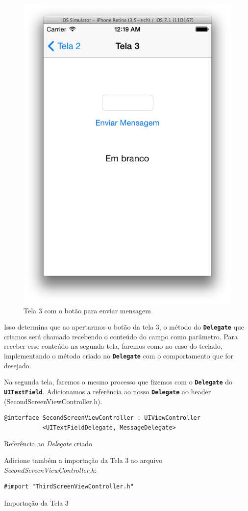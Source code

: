 \documentclass[a4paper,12pt,brazil,doubleside]{book}
\begin{document}
\begin{singlespace}
\begin{figure}[H]
  \centering
  \includegraphics[width=.55\textwidth]{figuras/3/tela_novo_projeto_49.png}
  \caption{Tela 3 com o botão para enviar mensagem}
  \label{fig:a}
\end{figure}


Isso determina que ao apertarmos o botão da tela 3, o método do \texttt{\textbf{Delegate}} que criamos será chamado recebendo o conteúdo do campo como parâmetro. Para receber esse conteúdo na segunda tela, faremos como no caso do teclado, implementando o método criado no \texttt{\textbf{Delegate}} com o comportamento que for desejado.

Na segunda tela, faremos o mesmo processo que fizemos com o \texttt{\textbf{Delegate}} do \texttt{\textbf{UITextField}}. Adicionamos a referência ao nosso \texttt{\textbf{Delegate}} ao header (SecondScreenViewController.h).\\

\begin{listing}[H]
\begin{verbatim}
@interface SecondScreenViewController : UIViewController
           <UITextFieldDelegate, MessageDelegate>
\end{verbatim}
\caption{Referência ao \emph{Delegate} criado}
\end{listing}


Adicione também a importação da Tela 3 ao arquivo \emph{SecondScreenViewController.h}:

\begin{listing}[H]
\begin{verbatim}
#import "ThirdScreenViewController.h"
\end{verbatim}
\caption{Importação da Tela 3}
\end{listing}



\end{singlespace}
\end{document}
